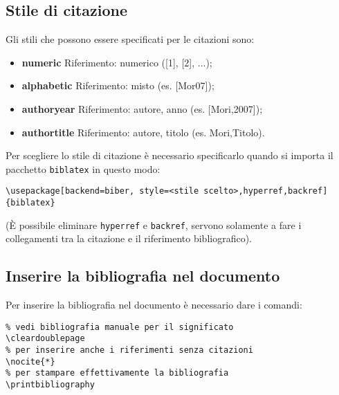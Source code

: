 \subsection{Stile di citazione}
Gli stili che possono essere specificati per le citazioni sono:
\begin{itemize}
    \item \textbf{numeric} Riferimento: numerico ([1], [2], ...);
    \item \textbf{alphabetic} Riferimento: misto (es. [Mor07]);
    \item \textbf{authoryear} Riferimento: autore, anno (es. [Mori,2007]);
    \item \textbf{authortitle} Riferimento: autore, titolo (es. Mori,Titolo).
\end{itemize}
Per scegliere lo stile di citazione è necessario specificarlo quando si importa
il pacchetto \verb!biblatex! in questo modo:
\begin{lstlisting}
\usepackage[backend=biber, style=<stile scelto>,hyperref,backref]{biblatex}
\end{lstlisting}
(È possibile eliminare \texttt{hyperref} e \texttt{backref}, servono solamente
a fare i collegamenti tra la citazione e il riferimento bibliografico).

\subsection{Inserire la bibliografia nel documento}
Per inserire la bibliografia nel documento è necessario dare i comandi:
\begin{lstlisting}
% vedi bibliografia manuale per il significato
\cleardoublepage
% per inserire anche i riferimenti senza citazioni
\nocite{*}
% per stampare effettivamente la bibliografia
\printbibliography
\end{lstlisting}
